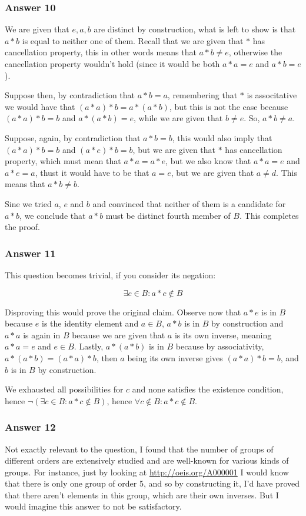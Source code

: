 \documentclass[11pt]{article}
\begin{document}
\subsubsection{Answer 10}
\label{sec-1-4-1}
We are given that $e, a, b$ are distinct by construction, what is left to show
is that $a*b$ is equal to neither one of them.  Recall that we are given that
$*$ has cancellation property, this in other words means that $a*b \neq e$,
otherwise the cancellation property wouldn't hold (since it would be both
$a*a=e$ and $a*b=e$).

Suppose then, by contradiction that $a*b=a$, remembering that $*$ is
associtative we would have that $(a*a)*b=a*(a*b)$, but this is not the case
because $(a*a)*b=b$ and $a*(a*b)=e$, while we are given that $b \neq e$. So,
$a*b \neq a$.

Suppose, again, by contradiction that $a*b=b$, this would also imply that
$(a*a)*b=b$ and $(a*e)*b=b$, but we are given that $*$ has cancellation property,
which must mean that $a*a=a*e$, but we also know that $a*a=e$ and $a*e=a$,
thust it would have to be that $a=e$, but we are given that $a \neq d$.  This
means that $a*b \neq b$.

Sine we tried $a$, $e$ and $b$ and convinced that neither of them is a
candidate for $a*b$, we conclude that $a*b$ must be distinct fourth member of
$B$.  This completes the proof.
\subsubsection{Answer 11}
\label{sec-1-4-2}
This question becomes trivial, if you consider its negation:

\begin{equation*}
  \exists c \in B: a*c \not \in B
\end{equation*}

Disproving this would prove the original claim.  Observe now that $a*e$ is
in $B$ because $e$ is the identity element and $a \in B$, $a*b$ is in $B$ by
construction and $a*a$ is again in $B$ because we are given that $a$ is its
own inverse, meaning $a*a=e$ and $e \in B$.  Lastly, $a*(a*b)$ is in $B$
because by associativity, $a*(a*b)=(a*a)*b$, then $a$ being its own inverse
gives $(a*a)*b=b$, and $b$ is in $B$ by construction.

We exhausted all possibilities for $c$ and none satisfies the
existence condition, hence $\lnot (\exists c \in B: a*c \not \in B)$, hence
$\forall c \not \in B: a*c \not \in B$.
\subsubsection{Answer 12}
\label{sec-1-4-3}
Not exactly relevant to the question, I found that the number of groups of
different orders are extensively studied and are well-known for various
kinds of groups.  For instance, just by looking at \url{http://oeis.org/A000001}
I would know that there is only one group of order 5, and so by constructing
it, I'd have proved that there aren't elements in this group, which are
their own inverses.  But I would imagine this answer to not be satisfactory.
\end{document}
